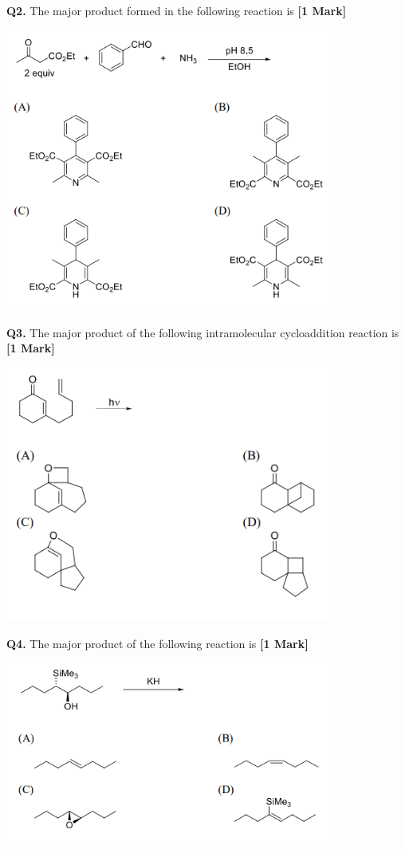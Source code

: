 \documentclass[11pt]{article}
\newcommand{\questiona}[2]{
    \noindent\textbf{Q#2.} #1 \hfill \textbf{[1 Mark]}
}
\begin{document}
\vspace{0.5cm}

\questiona{The major product formed in the following reaction is}{2}
\begin{center}
\includegraphics[width=0.8\textwidth]{figures/2}
\end{center}

\vspace{0.5cm}

\questiona{The major product of the following intramolecular cycloaddition reaction is}{3}
\begin{center}
\includegraphics[width=0.8\textwidth]{figures/3}
\end{center}

\vspace{0.5cm}

\questiona{The major product of the following reaction is}{4}
\begin{center}
\includegraphics[width=0.8\textwidth]{figures/4}
\end{center}
\end{document}
